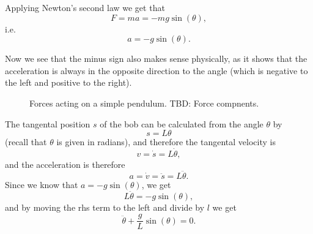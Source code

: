 Applying Newton's second law we get that
\begin{equation}
	F = ma = -mg\sin(\theta),
	\label{eq:simple_pendulum_newton_second_law}
\end{equation}
i.e.
\begin{equation}
	a = -g\sin(\theta).
	\label{eq:simple_pendulum_acceleration}
\end{equation}

Now we see that the minus sign also makes sense physically, as it shows that the acceleration is always in the opposite direction to the angle (which is negative to the left and positive to the right).

\begin{figure}
	\begin{center}
	\end{center}
	\caption{Forces acting on a simple pendulum. TBD: Force compnents.}
	\label{fig:simple_pendulum_forces}
\end{figure}

The tangental position $s$ of the bob can be calculated from the angle $\theta$ by
\begin{equation}
	s = L\theta
	\label{eq:simple_pendulum_tangental_position}
\end{equation}
(recall that $\theta$ is given in radians), and therefore the tangental velocity is
\begin{equation}
	v = \dot{s} = L\dot{\theta},
	\label{eq:simple_pendulum_tangental_velovity}
\end{equation}
and the acceleration is therefore
\begin{equation}
	a = \dot{v} = \ddot{s} = L\ddot{\theta}.
	\label{eq:simple_pendulum_tangental_acceleration}
\end{equation}
Since we know that $a=-g\sin(\theta)$, we get
\begin{equation}
	L\ddot{\theta} = -g\sin(\theta),
\end{equation}
and by moving the rhs term to the left and divide by $l$ we get
\begin{equation}
	\ddot{\theta} + \frac{g}{L}\sin(\theta) = 0.
	\label{eq:simple_pendulum_differential_equation}
\end{equation}


